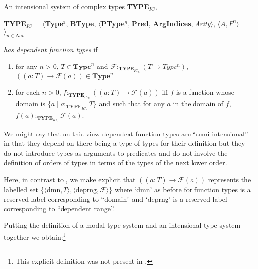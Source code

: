 \label{pg:dep-fn-types}An intensional system of complex types \textbf{TYPE}$_\mathit{IC}$,
\begin{display}
{\bf TYPE$_\mathit{IC}$} = $\langle${\bf Type}$^n$, {\bf BType},
$\langle$\textbf{PType}$^n$, {\bf Pred}, \textbf{ArgIndices}, {\it
  Arity\/}$\rangle$, $\langle A,F^n\rangle$$\rangle_{n\in\mathit{Nat}}$
\end{display} 
\textit{has dependent function types} if
\begin{enumerate} 
 
\item for any $n>0$, $T \in \mathbf{Type}^n$ and
  $\mathcal{F}:_{\mathbf{TYPE}_{\mathit{IC}_n}}(T\rightarrow\mathit{Type^n})$,
  $((a:T)\rightarrow \mathcal{F}(a)) \in \mathbf{Type}^n$ 
 
\item for each $n>0$,
$f:_{\mathbf{TYPE}_{\mathit{IC}_n}}((a:T)\rightarrow \mathcal{F}(a))$
iff $f$ is a function whose domain is $\{a\mid
a:_{\mathbf{TYPE}_{\mathit{IC}_n}}T\}$ and such that for any $a$ in the
domain of $f$, $f(a):_{\mathbf{TYPE}_{\mathit{IC}_n}}\mathcal{F}(a)$.
   
 
\end{enumerate} 
We might say that on this view dependent function types are
``semi-intensional'' in that they depend on there being a type of
types for their definition but they do not introduce types as
arguments to predicates and do not involve the definition of orders of
types in terms of the types of the next lower order.

Here, in contrast to \cite{Cooper2012}, we make explicit that
$((a:T)\rightarrow \mathcal{F}(a))$ represents the labelled set
$\{\langle\mathrm{dmn},T\rangle,\langle\mathrm{deprng},\mathcal{F}\rangle\}$
where `dmn' as before for function types is a reserved label
corresponding to ``domain'' and `deprng' is a reserved label
corresponding to ``dependent range''.

Putting the definition of a modal type system and an intensional type
system together we obtain:\footnote{This explicit definition was not
  present in \cite{Cooper2012}.}

